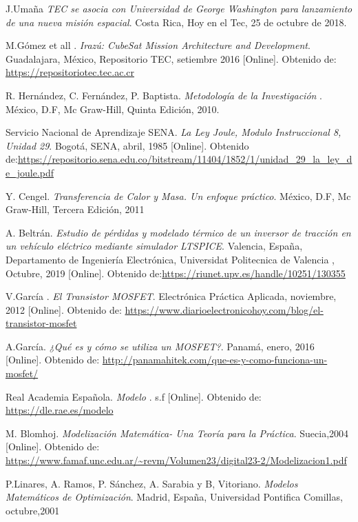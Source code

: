 \documentclass[notitlepage,oneside]{book}
\begin{document}
\begin{thebibliography}{99}
J.Umaña \emph{TEC se asocia con Universidad de George Washington para lanzamiento de una nueva misión espacial}. Costa Rica, Hoy en el Tec, 25 de octubre de 2018.

M.Gómez et all . \emph {Irazú: CubeSat Mission Architecture and Development}. Guadalajara, México, Repositorio TEC, setiembre 2016 [Online]. Obtenido de: \url{https://repositoriotec.tec.ac.cr}

R. Hernández, C. Fernández, P. Baptista. \emph {Metodología de la Investigación }. México, D.F, Mc Graw-Hill, Quinta Edición, 2010.

Servicio Nacional de Aprendizaje SENA. \emph {La Ley Joule, Modulo Instruccional 8, Unidad 29}. Bogotá, SENA, abril, 1985 [Online]. Obtenido de:\url{https://repositorio.sena.edu.co/bitstream/11404/1852/1/unidad_29_la_ley_de_joule.pdf}

Y. Cengel. \emph {Transferencia de Calor y Masa. Un enfoque práctico}. México, D.F, Mc Graw-Hill, Tercera Edición, 2011

A. Beltrán. \emph {Estudio de pérdidas y modelado térmico de un inversor de tracción en un vehículo eléctrico mediante simulador LTSPICE}. Valencia, España, Departamento de Ingeniería Electrónica, Universidat  Politecnica de Valencia , Octubre, 2019 [Online]. Obtenido de:\url{https://riunet.upv.es/handle/10251/130355} %

V.García . \emph {El Transistor MOSFET}. Electrónica Práctica Aplicada, noviembre, 2012 [Online]. Obtenido de: \url{https://www.diarioelectronicohoy.com/blog/el-transistor-mosfet}

A.García. \emph {¿Qué es y cómo se utiliza un MOSFET?}. Panamá, enero, 2016 [Online]. Obtenido de: \url{http://panamahitek.com/que-es-y-como-funciona-un-mosfet/}

Real Academia Española. \emph {Modelo }. s.f [Online]. Obtenido de: \url{https://dle.rae.es/modelo}

M. Blomhoj. \emph {Modelización Matemática- Una Teoría para la Práctica}. Suecia,2004 [Online]. Obtenido de: \url{https://www.famaf.unc.edu.ar/~revm/Volumen23/digital23-2/Modelizacion1.pdf}

P.Linares, A. Ramos, P. Sánchez, A. Sarabia y B, Vitoriano. \emph {Modelos Matemáticos de Optimización}. Madrid, España, Universidad Pontifica Comillas, octubre,2001


\end{thebibliography}
\end{document}
